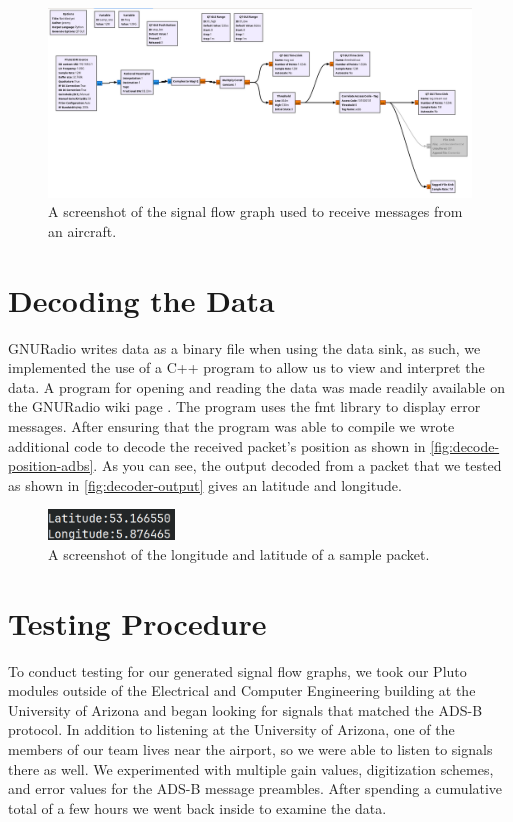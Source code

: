 \documentclass[journal, onecolumn]{IEEEtran}
\begin{document}
\begin{figure}
  \begin{center}
    \includegraphics[width=\textwidth]{./figures/fig_sfg_gnuradio.png}
  \end{center}
  \caption{A screenshot of the signal flow graph used to receive messages from an aircraft.}\label{fig:fig_sfg_gnuradio}
\end{figure}


\section{Decoding the Data}
GNURadio writes data as a binary file when using the data sink, as such, we implemented the use of a C++ program to allow us to view and interpret the data. A program for opening and reading the data was made readily available on the GNURadio wiki page \cite{gnuradio-reading-file-cpp}. 
The program uses the fmt library\cite{fmt-library} to display error messages.
After ensuring that the program was able to compile we wrote additional code to decode the received packet's position as shown in \autoref{fig:decode-position-adbs}.
As you can see, the output decoded from a packet that we tested as shown in \autoref{fig:decoder-output} gives an latitude and longitude.


\begin{figure}
  \begin{center}
    \includegraphics[width=0.3\textwidth]{./figures/fig_output_decode.png}
  \end{center}
  \caption{A screenshot of the longitude and latitude of a sample packet.}\label{fig:decode-position-adbs}
\end{figure}


\section{Testing Procedure}
To conduct testing for our generated signal flow graphs, we took our Pluto modules outside of the Electrical and Computer Engineering building at the University of Arizona and began looking for signals that matched the ADS-B protocol.
In addition to listening at the University of Arizona, one of the members of our team lives near the airport, so we were able to listen to signals there as well. 
We experimented with multiple gain values, digitization schemes, and error values for the ADS-B message preambles. 
After spending a cumulative total of a few hours we went back inside to examine the data.
\end{document}
